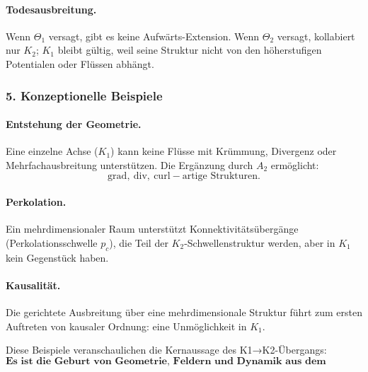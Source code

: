 \paragraph{Todesausbreitung.}
Wenn $\Theta_1$ versagt, gibt es keine Aufwärts-Extension.
Wenn $\Theta_2$ versagt, kollabiert nur $K_2$; $K_1$ bleibt gültig, weil seine
Struktur nicht von den höherstufigen Potentialen oder Flüssen abhängt.

\subsubsection{5. Konzeptionelle Beispiele}

\paragraph{Entstehung der Geometrie.}
Eine einzelne Achse ($K_1$) kann keine Flüsse mit Krümmung, Divergenz oder
Mehrfachausbreitung unterstützen. Die Ergänzung durch $A_2$ ermöglicht:
\[
\mathrm{grad},\ \mathrm{div},\ \mathrm{curl}-\text{artige Strukturen}.
\]

\paragraph{Perkolation.}
Ein mehrdimensionaler Raum unterstützt Konnektivitätsübergänge
(Perkolationsschwelle $p_c$), die Teil der $K_2$-Schwellenstruktur werden, aber
in $K_1$ kein Gegenstück haben.

\paragraph{Kausalität.}
Die gerichtete Ausbreitung über eine mehrdimensionale Struktur führt zum ersten
Auftreten von kausaler Ordnung: eine Unmöglichkeit in $K_1$.

Diese Beispiele veranschaulichen die Kernaussage des K1→K2-Übergangs:
\[
\textbf{Es ist die Geburt von Geometrie, Feldern und Dynamik aus dem minimalen
repräsentationalen Kontinuum.}
\]
